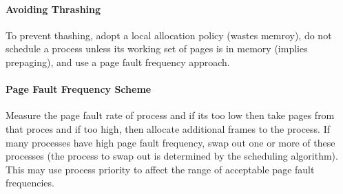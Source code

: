 \documentclass{article}
\begin{document}
\paragraph{Avoiding Thrashing}

To prevent thashing, adopt a local allocation policy (wastes memroy), do not schedule a process unless its working set of pages is in memory (implies prepaging), and use a page fault frequency approach. 

\paragraph{Page Fault Frequency Scheme}

Measure the page fault rate of process and if its too low then take pages from that proces and if too high, then allocate additional frames to the process. If many processes have high page fault frequency, swap out one or more of these processes (the process to swap out is determined by the scheduling algorithm). This may use process priority to affect the range of acceptable page fault frequencies. 
\end{document}
